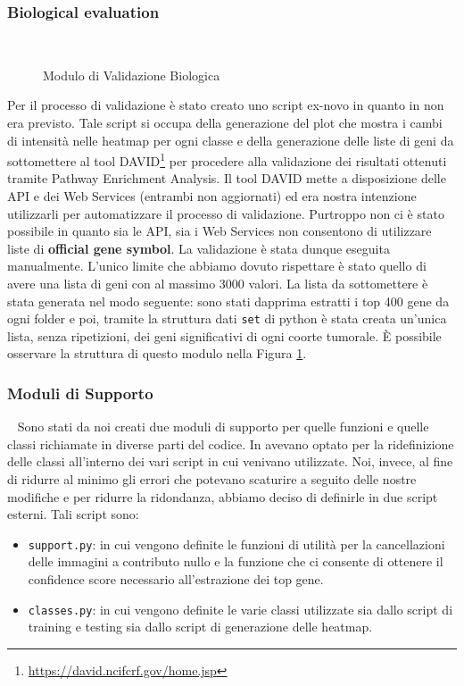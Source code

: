 \subsubsection{Biological evaluation} ~ \newline
\begin{figure}[hbpt!]
		\centering
		
  		\caption{Modulo di Validazione Biologica}
        \label{fig:biological_validation}
\end{figure}
Per il processo di validazione è stato creato uno script ex-novo in quanto in \cite{lyu2018deep} non era previsto.
Tale script si occupa della generazione del plot che mostra i cambi di intensità nelle heatmap per ogni classe
e della generazione delle liste di geni da sottomettere al tool DAVID\footnote{\url{https://david.ncifcrf.gov/home.jsp}}
per procedere alla validazione dei risultati ottenuti tramite Pathway Enrichment Analysis.
Il tool DAVID mette a disposizione delle API e dei Web Services (entrambi non aggiornati) ed era nostra intenzione
utilizzarli per automatizzare il processo di validazione. Purtroppo non ci è stato possibile in quanto sia le API, 
sia i Web Services non consentono di utilizzare liste di \textbf{official gene symbol}. La validazione è stata 
dunque eseguita manualmente.
L'unico limite che abbiamo dovuto rispettare è stato quello di avere una lista di geni con al massimo
$3000$ valori. 
La lista da sottomettere è stata generata nel modo seguente: sono stati dapprima estratti i top 400 gene 
da ogni folder e poi, tramite la struttura dati \texttt{set} di python è stata creata un'unica lista, 
senza ripetizioni, dei geni significativi di ogni coorte tumorale. 
È possibile osservare la struttura di questo modulo nella Figura \ref{fig:biological_validation}.

\subsubsection{Moduli di Supporto}~\newline 
\label{appendix_2.7}
Sono stati da noi creati due moduli di supporto per quelle funzioni e quelle classi richiamate in diverse 
parti del codice.
In \cite{lyu2018deep} avevano optato per la ridefinizione delle classi all'interno dei vari script in cui 
venivano utilizzate. 
Noi, invece, al fine di ridurre al minimo gli errori che potevano scaturire a seguito delle nostre modifiche 
e per ridurre la ridondanza, abbiamo deciso di definirle in due script esterni. Tali script sono:
\begin{itemize}
    \item \texttt{support.py}: in cui vengono definite le funzioni di utilità per la cancellazioni delle immagini 
          a contributo nullo e la funzione che ci consente di ottenere il confidence score necessario all'estrazione 
          dei top gene.
    \item \texttt{classes.py}: in cui vengono definite le varie classi utilizzate sia dallo script di training e 
          testing sia dallo script di generazione delle heatmap.
\end{itemize}

